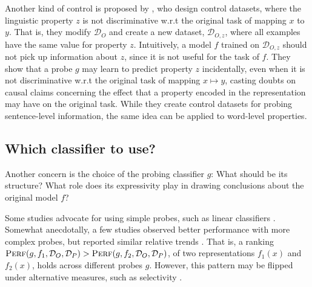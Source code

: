 \documentclass[discussion]{clv3}
\begin{document}
Another kind of control is proposed by \citet{ravichander:2021:eacl}, who design control datasets, where the linguistic property $z$ is not discriminative w.r.t the original task of mapping $x$ to $y$. That is, they modify $\mathcal{D}_O$ and create a new dataset, $\mathcal{D}_{O,z}$, where all examples have the same value for property $z$. Intuitively, a model $f$ trained on $\mathcal{D}_{O,z}$ should not pick up information about $z$, since it is not useful for the task of $f$. They show that a probe $g$ may learn to predict property $z$ incidentally, even when it is not discriminative w.r.t the original task of mapping $x \mapsto y$, casting doubts on causal claims concerning the effect that a property encoded in the representation may have on the original task. While they create control datasets for probing sentence-level information, the same idea can be applied to word-level properties.  



\subsection{Which classifier to use?}


Another concern is the choice of the probing classifier $g$: 
What should be its structure? What role does its expressivity play in drawing conclusions about the original model $f$? 

Some studies advocate for using simple probes, such as linear classifiers \cite{alain2016understanding,hupkes2018visualisation,liu-etal-2019-linguistic,hall-maudslay-etal-2020-tale}. Somewhat anecdotally, a few studies observed better performance with more complex probes, but reported similar relative trends \cite{conneau-etal-2018-cram,belinkov:2018:phdthesis}. That is, a ranking 
 $\textsc{Perf}(g, f_1, \mathcal{D}_O, \mathcal{D}_P) > \textsc{Perf}(g, f_2, \mathcal{D}_O, \mathcal{D}_P)$, of two representations $f_1(x)$ and $f_2(x)$,  holds across different probes $g$. 
However, this pattern may be flipped under alternative measures, such as selectivity \cite{hewitt-liang-2019-designing}. 
\end{document}
